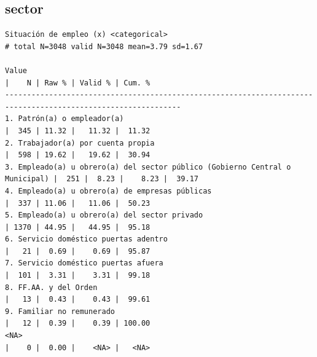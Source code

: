 \documentclass[
  letterpaper,
  DIV=11,
  numbers=noendperiod]{scrreprt}
\newenvironment{Shaded}{\begin{snugshade}}{\end{snugshade}}
\newcommand{\FunctionTok}[1]{\textcolor[rgb]{0.28,0.35,0.67}{#1}}
\newcommand{\NormalTok}[1]{\textcolor[rgb]{0.00,0.23,0.31}{#1}}
\newcommand{\SpecialCharTok}[1]{\textcolor[rgb]{0.37,0.37,0.37}{#1}}
\begin{document}
\hypertarget{sector}{%
\subsection{sector}\label{sector}}

\begin{Shaded}
\end{Shaded}

\begin{verbatim}
Situación de empleo (x) <categorical> 
# total N=3048 valid N=3048 mean=3.79 sd=1.67

Value                                                                        |    N | Raw % | Valid % | Cum. %
--------------------------------------------------------------------------------------------------------------
1. Patrón(a) o empleador(a)                                                  |  345 | 11.32 |   11.32 |  11.32
2. Trabajador(a) por cuenta propia                                           |  598 | 19.62 |   19.62 |  30.94
3. Empleado(a) u obrero(a) del sector público (Gobierno Central o Municipal) |  251 |  8.23 |    8.23 |  39.17
4. Empleado(a) u obrero(a) de empresas públicas                              |  337 | 11.06 |   11.06 |  50.23
5. Empleado(a) u obrero(a) del sector privado                                | 1370 | 44.95 |   44.95 |  95.18
6. Servicio doméstico puertas adentro                                        |   21 |  0.69 |    0.69 |  95.87
7. Servicio doméstico puertas afuera                                         |  101 |  3.31 |    3.31 |  99.18
8. FF.AA. y del Orden                                                        |   13 |  0.43 |    0.43 |  99.61
9. Familiar no remunerado                                                    |   12 |  0.39 |    0.39 | 100.00
<NA>                                                                         |    0 |  0.00 |    <NA> |   <NA>
\end{verbatim}
\end{document}
